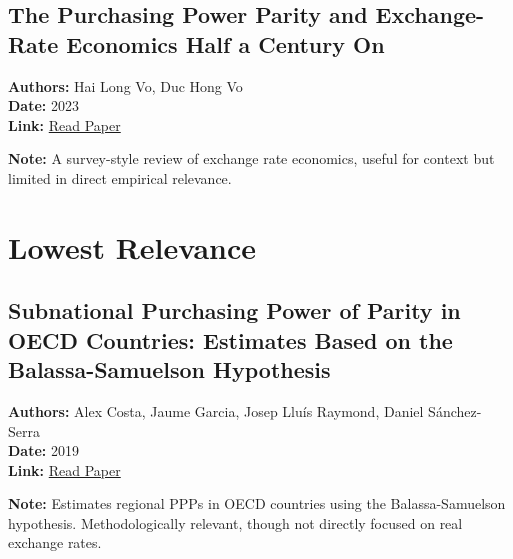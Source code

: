 \documentclass[
  11pt,
]{article}
\begin{document}
\subsection{The Purchasing Power Parity and Exchange-Rate Economics Half
a Century
On}\label{the-purchasing-power-parity-and-exchange-rate-economics-half-a-century-on}

\textbf{Authors:} Hai Long Vo, Duc Hong Vo\\
\textbf{Date:} 2023\\
\textbf{Link:}
\href{https://drive.google.com/file/d/1GvSoUtKJiy58EFfif0aoFeuvEYS26tqs/view?usp=sharing}{Read
Paper}

\textbf{Note:} A survey-style review of exchange rate economics, useful
for context but limited in direct empirical relevance.

\section{Lowest Relevance}\label{lowest-relevance}

\subsection{Subnational Purchasing Power of Parity in OECD Countries:
Estimates Based on the Balassa-Samuelson
Hypothesis}\label{subnational-purchasing-power-of-parity-in-oecd-countries-estimates-based-on-the-balassa-samuelson-hypothesis}

\textbf{Authors:} Alex Costa, Jaume Garcia, Josep Lluís Raymond, Daniel
Sánchez-Serra\\
\textbf{Date:} 2019\\
\textbf{Link:}
\href{https://drive.google.com/file/d/1QT0iR2TwIY5ayraL7pAe0Ir_R03U17nR/view?usp=sharing}{Read
Paper}

\textbf{Note:} Estimates regional PPPs in OECD countries using the
Balassa-Samuelson hypothesis. Methodologically relevant, though not
directly focused on real exchange rates.


\printbibliography
\end{document}
